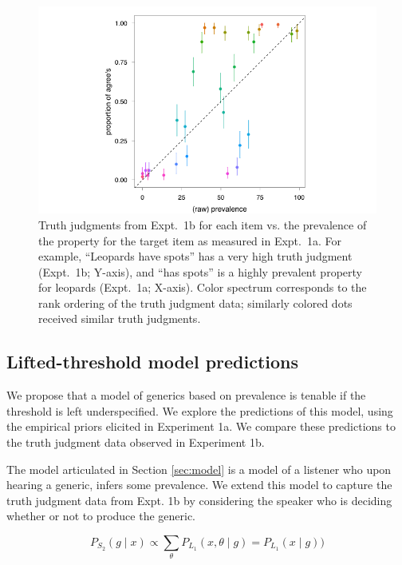 \documentclass[10pt,letterpaper]{article}
\begin{document}
\begin{figure}
\centering
    \includegraphics[width=0.8\columnwidth]{tj_n50_tjVsPrevalence}
    \caption{Truth judgments from Expt.~1b for each item vs. the prevalence of the property for the target item as measured in Expt.~1a. For example, ``Leopards have spots'' has a very high truth judgment (Expt.~1b; Y-axis), and ``has spots'' is a highly prevalent property for leopards (Expt.~1a; X-axis). Color spectrum corresponds to the rank ordering of the truth judgment data; similarly colored dots received similar truth judgments.}
  \label{fig:scatterprev}
\end{figure}




\subsection{Lifted-threshold model predictions}

We propose that a model of generics based on prevalence is tenable if the threshold is left underspecified. We explore the predictions of this model, using the empirical priors elicited in Experiment 1a. We compare these predictions to the truth judgment data observed in Experiment 1b.

The model articulated in Section \ref{sec:model} is a model of a listener who upon hearing a generic, infers some prevalence. We extend this model to capture the truth judgment data from Expt. 1b by considering the speaker who is deciding whether or not to produce the generic. 


\begin{equation} 
P_{S_{2}}(g \mid x) \propto  \sum_{\theta} P_{L_{1}}(x , \theta \mid g) =  P_{L_{1}}(x \mid g))
\label{eq:S2}
\end{equation}
\end{document}
